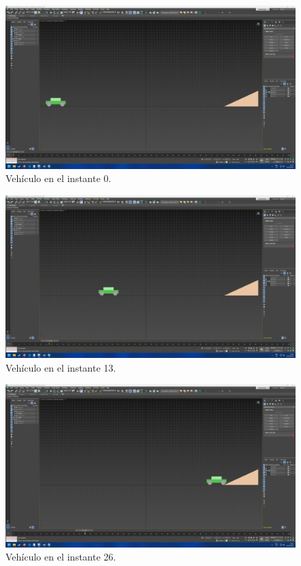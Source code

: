 \documentclass{article}
\begin{document}
\begin{figure}[H]
    \centering
    \includegraphics[width=\textwidth]{imagenes/Ejercicio2/keyframes/0.png}
    \caption{Vehículo en el instante 0.}
 \end{figure}
 \begin{figure}[H]
    \centering
    \includegraphics[width=\textwidth]{imagenes/Ejercicio2/keyframes/13.png}
    \caption{Vehículo en el instante 13.}
 \end{figure}
 \begin{figure}[H]
    \centering
    \includegraphics[width=\textwidth]{imagenes/Ejercicio2/keyframes/26.png}
    \caption{Vehículo en el instante 26.}
 \end{figure}
\end{document}
